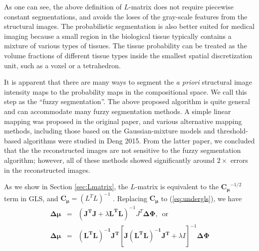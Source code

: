 \documentclass[12pt]{book}               %
\begin{document}
As one can see, the above definition of $L$-matrix does not require piecewise constant segmentations, and avoids the loses of the gray-scale features from the structural images. The probabilistic segmentation is also better suited for medical imaging because a small region in the biological tissue typically contains a mixture of various types of tissues. The tissue probability can be treated as the volume fractions of different tissue types inside the smallest spatial discretization unit, such as a voxel or a tetrahedron.

It is apparent that there are many ways to segment the \emph{a priori} structural image intensity maps to the probability maps in the compositional space. We call this step as the ``fuzzy segmentation''. The above proposed algorithm is quite general and can accommodate many fuzzy segmentation methods. A simple linear mapping was proposed in the original paper, and various alternative mapping methods, including those based on the Gaussian-mixture models and threshold-based algorithms were studied in Deng 2015. From the latter paper, we concluded that the the reconstructed images are not sensitive to the fuzzy segmentation algorithm; however, all of these methods showed significantly around $2\times$ errors in the reconstructed images.

As we show in Section \ref{sec:Lmatrix}, the $L$-matrix is equivalent to the $\mathbf{C_\mu}^{-1/2}$ term in GLS, and $\mathbf{C_\mu}=(L^TL)^{-1}$ . Replacing $\mathbf{C_\mu}$ to (\ref{eq:undergls}), we have
\begin{eqnarray}
\mathbf{\Delta\mu}&=& (\mathbf{J^TJ}+\lambda \mathbf{L^TL})^{-1}J^T\mathbf{\Delta\Phi},\,\textrm{ or}\\
\mathbf{\Delta\mu}&=&\mathbf{(L^TL)^{-1} J^T}\left[\mathbf{J(L^TL)^{-1}J^T}+\lambda I\right]^{-1}\mathbf{\Delta\Phi}
\end{eqnarray}
\end{document}
